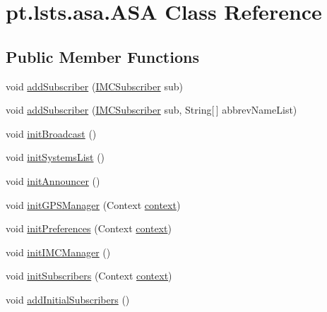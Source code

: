 \hypertarget{classpt_1_1lsts_1_1asa_1_1ASA}{}\section{pt.\+lsts.\+asa.\+A\+S\+A Class Reference}
\label{classpt_1_1lsts_1_1asa_1_1ASA}
\subsection*{Public Member Functions}
\begin{DoxyCompactItemize}
\item 
void \hyperlink{classpt_1_1lsts_1_1asa_1_1ASA_a2cf6734759676841fd40b2cb63656f30}{add\+Subscriber} (\hyperlink{interfacept_1_1lsts_1_1asa_1_1comms_1_1IMCSubscriber}{I\+M\+C\+Subscriber} sub)
\item 
void \hyperlink{classpt_1_1lsts_1_1asa_1_1ASA_aa603b315532b73078a2472e2cf40cce1}{add\+Subscriber} (\hyperlink{interfacept_1_1lsts_1_1asa_1_1comms_1_1IMCSubscriber}{I\+M\+C\+Subscriber} sub, String\mbox{[}$\,$\mbox{]} abbrev\+Name\+List)
\item 
void \hyperlink{classpt_1_1lsts_1_1asa_1_1ASA_ad8cd0a63644f0e3b120d2db762abfa4f}{init\+Broadcast} ()
\item 
void \hyperlink{classpt_1_1lsts_1_1asa_1_1ASA_af952ed04d184b779b0ed380ba63b00b1}{init\+Systems\+List} ()
\item 
void \hyperlink{classpt_1_1lsts_1_1asa_1_1ASA_ac5a02ce0548dd6009e29397bd66538bf}{init\+Announcer} ()
\item 
void \hyperlink{classpt_1_1lsts_1_1asa_1_1ASA_a5586a5ebd4f2ee02a41072544440f53d}{init\+G\+P\+S\+Manager} (Context \hyperlink{classpt_1_1lsts_1_1asa_1_1ASA_ad16e2c7db27b0a63a471c62f1fdcc1df}{context})
\item 
void \hyperlink{classpt_1_1lsts_1_1asa_1_1ASA_a6a93b8538e58d17a5e1d88b55787c5a4}{init\+Preferences} (Context \hyperlink{classpt_1_1lsts_1_1asa_1_1ASA_ad16e2c7db27b0a63a471c62f1fdcc1df}{context})
\item 
void \hyperlink{classpt_1_1lsts_1_1asa_1_1ASA_a98f14397296a725e2f289e8b2a1f473b}{init\+I\+M\+C\+Manager} ()
\item 
void \hyperlink{classpt_1_1lsts_1_1asa_1_1ASA_afdf4f36c77660164aa94bb7eb2ed0658}{init\+Subscribers} (Context \hyperlink{classpt_1_1lsts_1_1asa_1_1ASA_ad16e2c7db27b0a63a471c62f1fdcc1df}{context})
\item 
void \hyperlink{classpt_1_1lsts_1_1asa_1_1ASA_ab864488952ef8706ff5c487846d7ec7c}{add\+Initial\+Subscribers} ()

\end{DoxyCompactItemize}
